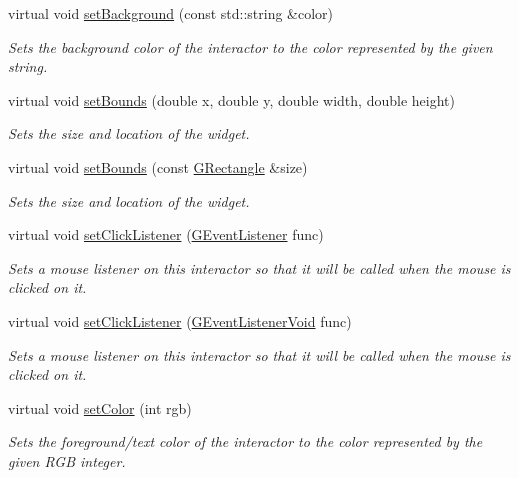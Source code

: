 \begin{DoxyCompactItemize}
virtual void \mbox{\hyperlink{classsgl_1_1GInteractor_ab4677ab2474e68b07aa56605af92a84a}{set\+Background}} (const std\+::string \&color)
\begin{DoxyCompactList}\small\item\em Sets the background color of the interactor to the color represented by the given string. \end{DoxyCompactList}\item 
virtual void \mbox{\hyperlink{classsgl_1_1GInteractor_a2aae8197624b72265ab83b4f1bc73f2f}{set\+Bounds}} (double x, double y, double width, double height)
\begin{DoxyCompactList}\small\item\em Sets the size and location of the widget. \end{DoxyCompactList}\item 
virtual void \mbox{\hyperlink{classsgl_1_1GInteractor_acada386653f008cacc7cce86426bef7c}{set\+Bounds}} (const \mbox{\hyperlink{structsgl_1_1GRectangle}{G\+Rectangle}} \&size)
\begin{DoxyCompactList}\small\item\em Sets the size and location of the widget. \end{DoxyCompactList}\item 
virtual void \mbox{\hyperlink{classsgl_1_1GInteractor_abd40af6921242584d0954f173911b190}{set\+Click\+Listener}} (\mbox{\hyperlink{namespacesgl_ae9f3e9eab70035da1a2b114e21357b25}{G\+Event\+Listener}} func)
\begin{DoxyCompactList}\small\item\em Sets a mouse listener on this interactor so that it will be called when the mouse is clicked on it. \end{DoxyCompactList}\item 
virtual void \mbox{\hyperlink{classsgl_1_1GInteractor_a856414c92df90f56f3877475eb3f8fc4}{set\+Click\+Listener}} (\mbox{\hyperlink{namespacesgl_a54427ce97bb1c2804e4fe2b0a62e8b17}{G\+Event\+Listener\+Void}} func)
\begin{DoxyCompactList}\small\item\em Sets a mouse listener on this interactor so that it will be called when the mouse is clicked on it. \end{DoxyCompactList}\item 
virtual void \mbox{\hyperlink{classsgl_1_1GInteractor_ab1f5cc0f5cc6bbbd716a526c61f1081d}{set\+Color}} (int rgb)
\begin{DoxyCompactList}\small\item\em Sets the foreground/text color of the interactor to the color represented by the given R\+GB integer. \end{DoxyCompactList}\item 

\end{DoxyCompactItemize}
